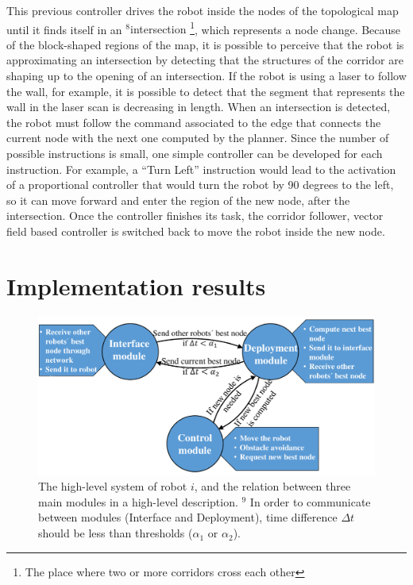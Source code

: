 \documentclass[smallcondensed]{svjour3}
\begin{document}
This previous controller drives the robot inside the nodes of the topological map until it finds itself in an {\color{blue}$^8$intersection \footnote{The place where two or more corridors cross each other}}, which represents a node change. Because of the block-shaped regions of the map, it is possible to perceive that the robot is approximating an intersection by detecting that the structures of the corridor are shaping up to the opening of an intersection. If the robot is using a laser to follow the wall, for example, it is possible to detect that the segment that represents the wall in the laser scan is decreasing in length. When an intersection is detected, the robot must follow the command associated to the edge that connects the current node with the next one computed by the planner. Since the number of possible instructions is small, one simple controller can be developed for each instruction.  For example, a ``Turn Left'' instruction would lead to the activation of a proportional controller that would turn the robot by 90 degrees to the left, so it can move forward and enter the region of the new node, after the intersection. Once the controller finishes its task, the corridor follower, vector field based controller is switched back to move the robot inside the new node. 

\section{Implementation results}
\label{sec:implementation}
%
\begin{figure}[b]
\centering
\includegraphics[width=0.993 \columnwidth]{Figures/Fig10.pdf}
\caption{The high-level system of robot $i$, and the relation between three main modules in a high-level description. {\color{blue}$^9$ In order to communicate between modules (Interface and Deployment), time difference $\Delta t$ should be less than thresholds ($\alpha_1$ or $\alpha_2$).} }
\label{fig:state}
\end{figure}
%
\end{document}
